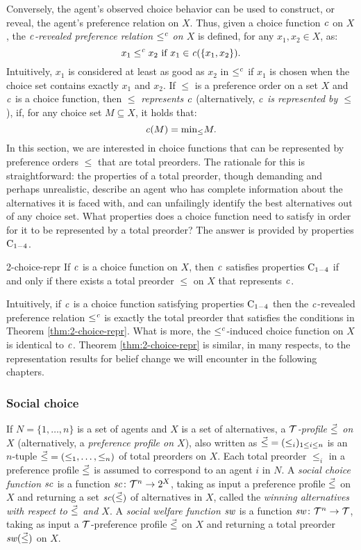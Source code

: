 Conversely, the agent's observed choice behavior 
can be used to construct, or reveal, the agent's preference relation on $X$.
Thus, given a choice function $\mathit{c}$ on $X$,
the \emph{$\mathit{c}$-revealed preference relation $\le^{\mathit{c}}$ on $X$} is defined, 
for any $x_1,x_2\in X$, as:
\begin{displaymath}
	x_1\le^{\mathit{c}} x_2~\text{if}~x_1\in\mathit{c}(\{x_1,x_2\}).
\end{displaymath} 
Intuitively, $x_1$ is considered at least as good as $x_2$ in $\le^{\mathit{c}}$
if $x_1$ is chosen when the choice set contains exactly $x_1$ and $x_2$.
If $\le$ is a preference order on a set $X$ and $\mathit{c}$ is a choice function,
then $\le$ \emph{represents $\mathit{c}$} (alternatively, \emph{$\mathit{c}$ is represented by $\le$}),
if, for any choice set $M \subseteq X$, it holds that:
$$
	\mathit{c}(M) = {\operatorname{min}}_{\le}M.
$$
In this section, we are interested in choice functions that can be 
represented by preference orders $\le$ that are total preorders. 
The rationale for this is straightforward:
the properties of a total preorder, though demanding and perhaps unrealistic,
describe an agent who has complete information about 
the alternatives it is faced with, and can unfailingly identify 
the best alternatives out of any choice set.
What properties does a choice function need to satisfy 
in order for it to be represented by a total preorder?
The answer is provided by properties $\mathrm{C}_{1-4}$.

\begin{thm}{\cite{Sen70}}{2-choice-repr}
	If $\mathit{c}$ is a choice function on $X$, then
	$\mathit{c}$ satisfies properties $\mathrm{C}_{1-4}$ if and only if 
	there exists a total preorder $\le$ on $X$ that represents $\mathit{c}$.
\end{thm}

Intuitively, if $\mathit{c}$ is a choice function satisfying properties $\mathrm{C}_{1-4}$
then the $\mathit{c}$-revealed preference relation $\le^{\mathit{c}}$ is exactly the total preorder
that satisfies the conditions in Theorem \ref{thm:2-choice-repr}.
What is more, the $\le^{\mathit{c}}$-induced choice function on $X$ is identical to $\mathit{c}$.
Theorem \ref{thm:2-choice-repr} is similar, in many respects,
to the representation results for belief change we will encounter in the 
following chapters.

\subsubsection{Social choice}
If $N=\{1,\dots,n\}$ is a set of agents and
$X$ is a set of alternatives,
a \emph{$\mathcal{T}$-profile ${\vec{\le}}$ on $X$}
(alternatively, a \emph{preference profile on $X$}), 
also written as ${\vec{\le}} = (\le_i)_{1\le i\le n}$
is an $n$-tuple ${\vec{\le}}=(\le_1,\dots,\le_n)$ 
of total preorders on $X$.
Each total preorder $\le_i$ in a preference profile ${\vec{\le}}$ 
is assumed to correspond to an agent $i$ in $N$.
A \emph{social choice function $\mathit{sc}$} 
is a function $\mathit{sc}\colon\mathcal{T}^n\rightarrow 2^X$,
taking as input a preference profile ${\vec{\le}}$ on $X$
and returning a set $\mathit{sc}({\vec{\le}})$ of alternatives in $X$, called
the \emph{winning alternatives with respect to ${\vec{\le}}$ and $X$}.
A \emph{social welfare function $\mathit{sw}$}
is a function $\mathit{sw}\colon\mathcal{T}^n\rightarrow \mathcal{T}$,
taking as input a $\mathcal{T}$-preference profile ${\vec{\le}}$ on $X$
and returning a total preorder $\mathit{sw}({\vec{\le}})$ on $X$.

